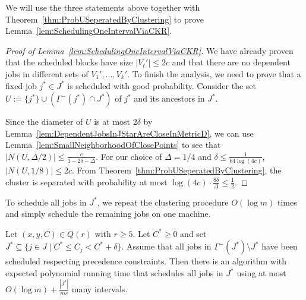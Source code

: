 We will use the three statements above together with Theorem~\ref{thm:ProbUSeperatedByClustering} to prove Lemma~\ref{lem:SchedulingOneIntervalViaCKR}.
\begin{proof}[Proof of Lemma~\ref{lem:SchedulingOneIntervalViaCKR}]
  We have already proven that the scheduled blocks have size $|V_{\ell}'| \leq 2c$ and that there are no dependent
  jobs in different sets of $V_1',\ldots,V_k'$. To finish the analysis, 
we need to prove that a fixed job $j^* \in J^*$ is scheduled with good probability.
Consider the set $U := \{ j^* \} \cup (\Gamma^-(j^*) \cap J^*)$ of $j^*$ and its ancestors in $J^*$.

Since the diameter of $U$ is at most $2\delta$ by Lemma~\ref{lem:DependentJobsInJStarAreCloseInMetricD}, 
we can use Lemma~\ref{lem:SmallNeighborhoodOfClosePoints}
to see that $ |N(U, \Delta/2)| \leq \frac{c}{1- 2\delta-  \Delta}$.
For our choice of $\Delta = 1/4$ and $\delta \leq \frac{1}{64 \log(4 c) }$, $|N(U,1/8)|\leq 2c$. 
From Theorem~\ref{thm:ProbUSeperatedByClustering},
the cluster is separated with probability at most 
 $\log(4c) \cdot  \frac{8 \delta}{\Delta} \leq \frac{1}{2}$.
\end{proof}

To schedule all jobs in $J^*$, we repeat the clustering procedure $O(\log m)$ times and simply schedule the remaining jobs on one machine. %


\begin{lemma} \label{lem: FullSchedulingOneIntervalViaCKR}
  Let $(x,y,C) \in Q(r)$ with $r \geq 5$. Let $C^* \geq 0$ and set $J^* \subseteq \{ j \in J \mid C^* \leq C_j < C^*+\delta\}$.
  Assume that all jobs in $\Gamma^{-}(J^*) \setminus J^*$ have been scheduled respecting precedence constraints.
  Then there is an algorithm with expected polynomial running time that schedules all jobs in $J^*$
  using at most $O(\log m) + \frac{|J^*|}{mc}$ many intervals. 
\end{lemma}

